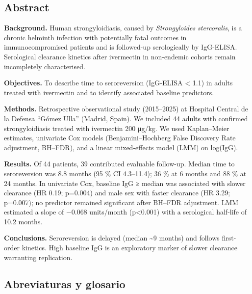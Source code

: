 \documentclass[
  spanish,
  12pt,
  a4paper,
]{article}
\begin{document}
\subsection*{Abstract}\label{abstract}

\textbf{Background.} Human strongyloidiasis, caused by
\emph{Strongyloides stercoralis}, is a chronic helminth infection with
potentially fatal outcomes in immunocompromised patients and is
followed-up serologically by IgG-ELISA. Serological clearance kinetics
after ivermectin in non-endemic cohorts remain incompletely
characterised.

\textbf{Objectives.} To describe time to seroreversion (IgG-ELISA
\textless{} 1.1) in adults treated with ivermectin and to identify
associated baseline predictors.

\textbf{Methods.} Retrospective observational study (2015--2025) at
Hospital Central de la Defensa ``Gómez Ulla'' (Madrid, Spain). We
included 44 adults with confirmed strongyloidiasis treated with
ivermectin 200 μg/kg. We used Kaplan--Meier estimates, univariate Cox
models (Benjamini--Hochberg False Discovery Rate adjustment, BH--FDR),
and a linear mixed-effects model (LMM) on log(IgG).

\textbf{Results.} Of 44 patients, 39 contributed evaluable follow-up.
Median time to seroreversion was 8.8 months (95 \% CI 4.3--11.4); 36 \%
at 6 months and 88 \% at 24 months. In univariate Cox, baseline IgG ≥
median was associated with slower clearance (HR 0.19; p=0.004) and male
sex with faster clearance (HR 3.29; p=0.007); no predictor remained
significant after BH--FDR adjustment. LMM estimated a slope of −0.068
units/month (p\textless0.001) with a serological half-life of 10.2
months.

\textbf{Conclusions.} Seroreversion is delayed (median \textasciitilde9
months) and follows first-order kinetics. High baseline IgG is an
exploratory marker of slower clearance warranting replication.

\newpage

\subsection*{Abreviaturas y glosario}\label{abreviaturas-y-glosario}
\end{document}
